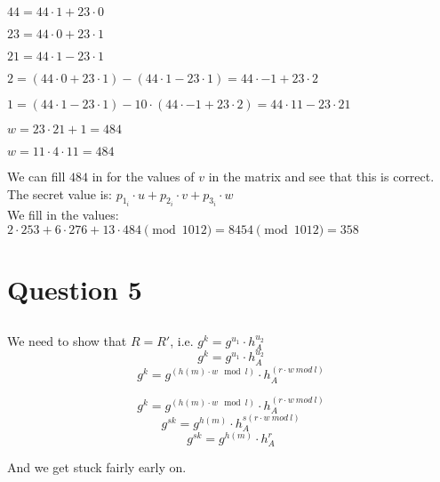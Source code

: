 \documentclass{article}
\begin{document}
$44 = 44 \cdot 1 + 23 \cdot 0$

$23 = 44 \cdot 0 + 23 \cdot 1$

$21 = 44 \cdot 1 - 23 \cdot 1$

$2 = (44 \cdot 0 + 23 \cdot 1) - (44 \cdot 1 - 23 \cdot 1) = 44 \cdot -1 + 23 \cdot 2 $

$1 = (44 \cdot 1 - 23 \cdot 1) - 10 \cdot (44 \cdot -1 + 23 \cdot 2) = 44 \cdot 11 - 23 \cdot 21$

$w = 23 \cdot 21 + 1 = 484$

$w = 11 \cdot 4 \cdot 11 = 484$

We can fill $484$ in for the values of $v$ in the matrix and see that this is correct.\\

The secret value is: $p_{{1}_{i}} \cdot u + p_{{2}_{i}} \cdot v + p_{{3}_{i}} \cdot w$\\
We fill in the values: $ 2 \cdot 253 + 6 \cdot 276 + 13 \cdot 484 \pmod{1012} = 8454 \pmod{1012} = 358$

\section{Question 5}
\subsection{}
We need to show that $R = R'$, i.e. $g^k=g^{u_1} \cdot h_A^{u_2}$
\[ g^k=g^{u_1} \cdot h_A^{u_2} \]
\[ g^k=g^{(h(m) \cdot w \mod l)} \cdot h_A^{(r \cdot w~mod~l)} \]

\[ g^k=g^{(h(m) \cdot w \mod l)} \cdot h_A^{(r \cdot w~mod~l)} \]
\[ g^{sk}=g^{h(m)} \cdot h_A^{s(r \cdot w~mod~l)} \]
\[ g^{sk}=g^{h(m)} \cdot h_A^{r} \]

And we get stuck fairly early on.


\end{document}
